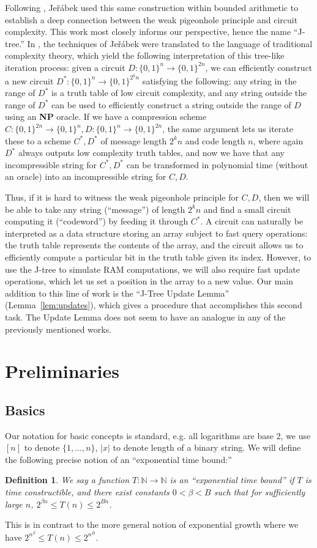 \documentclass[11pt]{article}
\newtheorem{definition}{Definition}
\newcommand{\B}{\{0,1\}}
\newcommand{\Jer}{Je\v{r}\'{a}bek }
\def\cl{\bf}
\begin{document}
Following \cite{Paris-Wilkie-Woods}, \Jer \cite{Jerabek} used this same construction within bounded arithmetic to establish a deep connection between the weak pigeonhole principle and circuit complexity. This work most closely informs our perspective, hence the name ``J-tree.'' In \cite{Korten}, the techniques of \Jer were translated to the language of traditional complexity theory, which yield the following interpretation of this tree-like iteration process: given a circuit $D\colon \B^n \rightarrow \B^{2n}$, we can efficiently construct a new circuit $D^*\colon \B^n \rightarrow \B^{2^k n}$ satisfying the following: any string in the range of $D^*$ is a truth table of low circuit complexity, and any string outside the range of $D^*$ can be used to efficiently construct a string outside the range of $D$ using an {\cl NP} oracle. If we have a compression scheme $C\colon\B^{2n}\rightarrow \B^n, D\colon\B^n\rightarrow \B^{2n}$, the same argument lets us iterate these to a scheme $C^*,D^*$ of message length $2^kn$ and code length $n$, where again $D^*$ always outputs low complexity truth tables, and now we have that any incompressible string for $C^*,D^*$ can be transformed in polynomial time (without an oracle) into an incompressible string for $C,D$.

Thus, if it is hard to witness the weak pigeonhole principle for $C,D$, then we will be able to take any string (``message'') of length $2^kn$ and find a small circuit computing it (``codeword'') by feeding it through $C^*$. A circuit can naturally be interpreted as a data structure storing an array subject to fast query operations: the truth table represents the contents of the array, and the circuit allows us to efficiently compute a particular bit in the truth table given its index. However, to use the J-tree to simulate RAM computations, we will also require fast update operations, which let  us set a position in the array to a new value. Our main addition to this line of work is the ``J-Tree Update Lemma'' (Lemma~\ref{lem:updates}), which gives a procedure that accomplishes this second task. The Update Lemma does not seem to have an analogue in any of the previously mentioned works.
\section{Preliminaries}\label{sec:prelim}
\subsection{Basics}\label{subsec:basics}
Our notation for basic concepts is standard, e.g. all logarithms are base 2, we use $[n]$ to denote $\{1,\ldots,n\}$, $|x|$ to denote length of a binary string. We will define the following precise notion of an ``exponential time bound:''
\begin{definition}
We say a function $T\colon \mathbb{N} \rightarrow \mathbb{N}$ is an ``exponential time bound'' if $T$ is time constructible, and there exist constants $0< \beta < B$ such that for sufficiently large $n$, $2^{\beta n} \leq T(n) \leq 2^{Bn}$.
\end{definition}
This is in contrast to the more general notion of exponential growth where we have $2^{n^\beta} \leq T(n) \leq 2^{n^B}$. 
\end{document}
